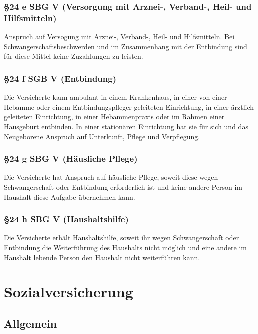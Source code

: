 \documentclass[a4paper, 12pt]{report}
\begin{document}
\subsubsection{\S 24 e SBG V (Versorgung mit Arznei-, Verband-, Heil- und
Hilfsmitteln)}

Anspruch auf Versogung mit Arznei-, Verband-, Heil- und Hilfsmitteln. Bei
Schwangerschaftsbeschwerden und im Zusammenhang mit der Entbindung sind für
diese Mittel keine Zuzahlungen zu leisten.

\subsubsection{\S 24 f SGB V (Entbindung)}

Die Versicherte kann ambulant in einem Krankenhaus, in einer von einer Hebamme
oder einem Entbindungspfleger geleiteten Einrichtung, in einer ärztlich
geleiteten Einrichtung, in einer Hebammenpraxis oder im Rahmen einer Hausgeburt
entbinden. In einer stationären Einrichtung hat sie für sich und das
Neugeborene Anspruch auf Unterkunft, Pflege und Verpflegung.

\subsubsection{\S 24 g SBG V (Häusliche Pflege)}

Die Versicherte hat Anspruch auf häusliche Pflege, soweit diese wegen
Schwangerschaft oder Entbindung erforderlich ist und keine andere Person im
Haushalt diese Aufgabe übernehmen kann.

\subsubsection{\S 24 h SBG V (Haushaltshilfe)}

Die Versicherte erhält Haushaltshilfe, soweit ihr wegen Schwangerschaft oder
Entbindung die Weiterführung des Haushalts nicht möglich und eine andere im
Haushalt lebende Person den Haushalt nicht weiterführen kann.

\newpage
\section{Sozialversicherung}

\subsection{Allgemein}
\end{document}
